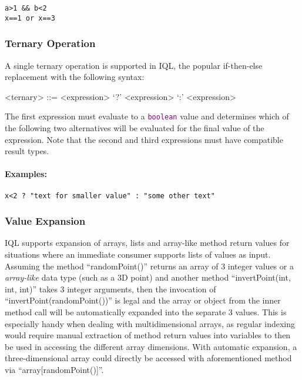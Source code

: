 \documentclass[11pt]{article}
\newcommand{\iql}{IQL\xspace}
\newcommand{\keyword}[1]{\textcolor{purple}{\texttt{#1}}}
\begin{document}
\begin{verbatim}
a>1 && b<2
x==1 or x==3
\end{verbatim}

\subsubsection{Ternary Operation}
\label{sec:ternary-operation}

A single ternary operation is supported in \iql, the popular if-then-else replacement with the following syntax:

\begin{grammar}	
	<ternary> ::= <expression> `?' <expression> `:' <expression>
\end{grammar}

\noindent The first expression must evaluate to a \keyword{boolean} value and determines which of the following two alternatives will be evaluated for the final value of the expression. Note that the second and third expressions must have compatible result types.

\paragraph{Examples:}

\begin{verbatim}
x<2 ? "text for smaller value" : "some other text"
\end{verbatim}

\subsubsection{Value Expansion}
\label{sec:value-expansion}

\iql supports expansion of arrays, lists and array-like method return values for situations where an immediate consumer supports lists of values as input. Assuming the method ``randomPoint()'' returns an array of 3 integer values or a \textit{array-like} data type (such as a 3D point) and another method ``invertPoint(int, int, int)'' takes 3 integer arguments, then the invocation of ``invertPoint(randomPoint())'' is legal and the array or object from the inner method call will be automatically expanded into the separate 3 values. This is especially handy when dealing with multidimensional arrays, as regular indexing would require manual extraction of method return values into variables to then be used in accessing the different array dimensions. With automatic expansion, a three-dimensional array could directly be accessed with aforementioned method via ``array[randomPoint()]''.
\end{document}
